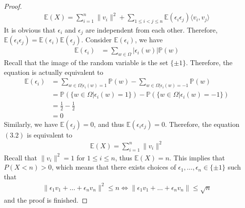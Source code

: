 \begin{proof}
\begin{align*}
    \mathbb{E}(X) = \sum_{i=1}^{n} \|v_{i}\|^{2} + \sum_{1 \leq i < j \leq n} \mathbb{E}(\epsilon_{i} \epsilon_{j}) \langle v_{i}, v_{j} \rangle \tag{3.2}
  \end{align*}
  It is obvious that $\epsilon_{i}$ and $\epsilon_{j}$ are independent from each other. Therefore, $\mathbb{E}(\epsilon_{i} \epsilon_{j}) = \mathbb{E}(\epsilon_{i})\mathbb{E}(\epsilon_{j})$. Consider $\mathbb{E}(\epsilon_{i})$, we have
  \begin{align*}
    \mathbb{E}(\epsilon_{i}) &= \sum_{w \in \Omega} |\epsilon_{i}(w)| \mathbb{P}(w)
  \end{align*}
  Recall that the image of the random variable is the set $\{\pm 1\}$. Therefore, the equation is actually equivalent to
  \begin{align*}
    \mathbb{E}(\epsilon_{i}) &= \sum_{w \in \Omega | \epsilon_{i}(w)=1} \mathbb{P}(w) - \sum_{w \in \Omega | \epsilon_{i}(w)=-1} \mathbb{P}(w) \\
                             &= \mathbb{P}(\{w \in \Omega | \epsilon_{i}(w)=1\}) - \mathbb{P}(\{w \in \Omega | \epsilon_{i}(w)=-1\}) \\
                             &= \frac{1}{2} - \frac{1}{2} \\
                             &= 0
  \end{align*}
  Similarly, we have $\mathbb{E}(\epsilon_{j})=0$, and thus $\mathbb{E}(\epsilon_{i} \epsilon_{j})=0$. Therefore, the equation $(3.2)$ is equivalent to
  \begin{align*}
    \mathbb{E}(X) = \sum_{i=1}^{n} \| v_{i} \|^{2}
  \end{align*}
  Recall that $\| v_{i} \|^{2} = 1$ for $1 \leq i \leq n$, thus $\mathbb{E}(X)=n$. This implies that $P(X < n) > 0$, which means that there exists choices of $\epsilon_{1}, \ldots, \epsilon_{n} \in \{\pm 1\}$ such that
  \begin{align*}
  \| \epsilon_{1}v_{1} + \ldots + \epsilon_{n}v_{n} \|^{2} \leq n \Leftrightarrow \| \epsilon_{1}v_{1} + \ldots + \epsilon_{n}v_{n} \| \leq \sqrt{n}  \end{align*}
  and the proof is finished.
\end{proof}

